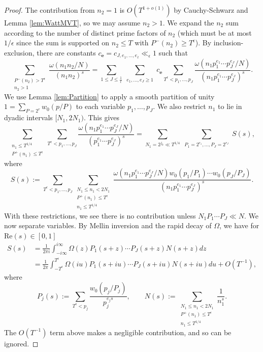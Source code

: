 \documentclass[12pt]{amsart}
\theoremstyle{plain}
\theoremstyle{definition}
\theoremstyle{remark}
\begin{document}
\begin{proof}
The contribution from $n_2=1$ is $O(T^{1+o(1)})$ by Cauchy-Schwarz and Lemma \ref{lem:WattMVT}, so we may assume $n_2 > 1$. We expand the $n_2$ sum according to the number of distinct prime factors of $n_2$ (which must be at most $1/\epsilon$ since the sum is supported on $n_2\le T$ with $P^-(n_2)\ge T^\epsilon$). By inclusion-exclusion, there are constants $c_{\mathbf{e}}=c_{J,e_1,\dots,e_\ell}\ll_\epsilon 1$ such that
\[
\sum_{\substack{P^-(n_2)>T^\epsilon \\ n_2 > 1}}\frac{\omega(n_1n_2/N)}{(n_1n_2)^s}=\sum_{1\leq J\le \frac{1}{\epsilon}}\sum_{\substack{e_1,\dots,e_J\ge 1}}c_{\mathbf{e}}\sum_{T^\epsilon< p_1,\dots,p_J}\frac{\omega(n_1 p_1^{e_1}\cdots p_J^{e_J}/N)}{(n_1p_1^{e_1}\cdots p_J^{e_J})^s}.
\]
We use Lemma \ref{lem:Partition} to apply a smooth partition of unity $1=\sum_{P=2^r}w_0(p/P)$ to each variable $p_1,\dots,p_J$. We also restrict $n_1$ to lie in dyadic intervals $[N_1,2N_1)$. This gives
\[
\sum_{\substack{n_1\leq T^{1/4}\\ P^+(n_1)\le T^{\epsilon}}}\sum_{T^\epsilon< p_1,\dots,p_J}\frac{\omega(n_1 p_1^{e_1}\cdots p_J^{e_J}/N)}{(p_1^{e_1}\cdots p_J^{e_J})^s}=\sum_{N_1=2^{j_0}\ll T^{1/4}}\sum_{\substack{P_1=2^{r_1},\dots,P_J=2^{r_J}}}S(s),
\]
where
\[
S(s):=\sum_{T^\epsilon< p_1,\dots,p_J}\sum_{\substack{N_1\le n_1<2N_1\\ P^+(n_1)\leq T^\epsilon\\ n_1\leq T^{1/4}}}\frac{\omega(n_1 p_1^{e_1}\cdots p_J^{e_J}/N)w_0(p_1/P_1)\cdots w_0(p_J/P_J)}{(n_1p_1^{e_1}\cdots p_J^{e_J})^s}.
\]
With these restrictions, we see there is no contribution unless $N_1 P_1\cdots P_J\ll N$. We now separate variables. By Mellin inversion and the rapid decay of $\Omega$, we have for $\text{Re}(s)\in[0,1]$
\begin{align*}
S(s)&=\frac{1}{2\pi i}\int_{-i\infty}^{i\infty}\Omega(z)P_1(s+z)\cdots P_J(s+z)N(s+z) dz\\
&=\frac{1}{2\pi} \int_{-T^{\epsilon}}^{T^{\epsilon}}\Omega(iu)P_1(s+iu)\cdots P_J(s+iu)N(s+iu) du+O(T^{-1}),
\end{align*}
where
\[
P_j(s):=\sum_{T^\epsilon<p_j}\frac{w_0(p_j/P_j)}{p_j^{e_js}},\qquad N(s):=\sum_{\substack{N_1\le n_1<2N_1\\ P^+(n_1)\leq T^\epsilon\\ n_1\leq T^{1/4}}}\frac{1}{n_1^s}.
\]
The $O(T^{-1})$ term above makes a negligible contribution, and so can be ignored.


\end{proof}
\end{document}

